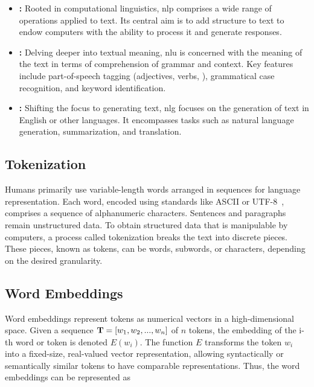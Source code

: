 \begin{itemize}
    \item \textbf{: } Rooted in computational linguistics, \gls{nlp} comprises a wide range of operations applied to text. Its central aim is to add structure to text to endow computers with the ability to process it and generate responses.
    \item \textbf{: } Delving deeper into textual meaning, \gls{nlu} is concerned with the meaning of the text in terms of comprehension of grammar and context. Key features include part-of-speech tagging (adjectives, verbs, \etc), grammatical case recognition, and keyword identification.    
    \item \textbf{: } Shifting the focus to generating text, \gls{nlg} focuses on the generation of text in English or other languages. It encompasses tasks such as natural language generation, summarization, and translation.
\end{itemize}

\subsection{Tokenization}

Humans primarily use variable-length words arranged in sequences for language representation. Each word, encoded using standards like ASCII or UTF-8~\cite{rao2019natural}, comprises a sequence of alphanumeric characters. Sentences and paragraphs remain unstructured data. To obtain structured data that is manipulable by computers, a process called tokenization breaks the text into discrete pieces. These pieces, known as tokens, can be words, subwords, or characters, depending on the desired granularity.



\subsection{Word Embeddings}

Word embeddings represent tokens as numerical vectors in a high-dimensional space. Given a sequence $\mathbf{T} = [w_1,w_2, ..., w_n]$ of $n$ tokens, the embedding of the i-th word or token is denoted $E(w_i)$. The function $E$ transforms the token $w_i$ into a fixed-size, real-valued vector representation, allowing syntactically or semantically similar tokens to have comparable representations. Thus, the word embeddings can be represented as

